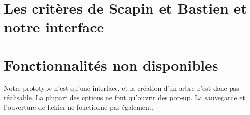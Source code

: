 \documentclass[12pt, a4paper]{article}
\begin{document}
\section{Les critères de Scapin et Bastien et notre interface}

\section{Fonctionnalités non disponibles}

Notre prototype n'est qu'une interface, et la création d'un arbre n'est donc pas réalisable. La plupart des options ne font qu'ouvrir des pop-up. La sauvegarde et l'ouverture de fichier ne fonctionne pas également.
\end{document}
